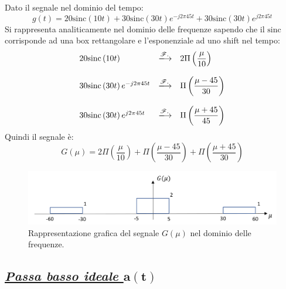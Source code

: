 \documentclass[a4paper]{article}
\begin{document}
	Dato il segnale nel dominio del tempo:
	\begin{equation*}
		g\left(t\right) = 20\mathrm{sinc}\left(10t\right) + 30\mathrm{sinc}\left(30t\right) e^{-j2\pi45t} + 30\mathrm{sinc}\left(30t\right) e^{j2\pi45t}
	\end{equation*}
	Si rappresenta analiticamente nel dominio delle frequenze sapendo che il $\mathrm{sinc}$ corrisponde ad una box rettangolare e l'esponenziale ad uno shift nel tempo:
	\begin{equation*}
		\begin{array}{lll}
			20\mathrm{sinc}\left(10t\right) & \xlongrightarrow{\mathscr{F.}} & 2 \Pi\left(\dfrac{\mu}{10}\right) \\
			\\
			30\mathrm{sinc}\left(30t\right) e^{-j2\pi45t} & \xlongrightarrow{\mathscr{F.}} & \Pi\left(\dfrac{\mu - 45}{30}\right) \\
			\\
			30\mathrm{sinc}\left(30t\right) e^{j2\pi45t} & \xlongrightarrow{\mathscr{F.}} & \Pi\left(\dfrac{\mu + 45}{45}\right)
		\end{array}
	\end{equation*}
	Quindi il segnale è:
	\begin{equation*}
		G\left(\mu\right) = 2 \Pi\left(\dfrac{\mu}{10}\right) + \Pi\left(\dfrac{\mu - 45}{30}\right) + \Pi\left(\dfrac{\mu + 45}{30}\right)
	\end{equation*}
	\begin{figure}[!htp]
		\centering	
		\includegraphics[width=\textwidth]{img/fig_6.png}
		\caption*{Rappresentazione grafica del segnale $G\left(\mu\right)$ nel dominio delle frequenze.}
	\end{figure}\newpage
	
	\subsection*{\textcolor{Green4}{\underline{\textbf{\emph{Passa basso ideale $\boldsymbol{a\left(t\right)}$}}}}}
	
\end{document}
